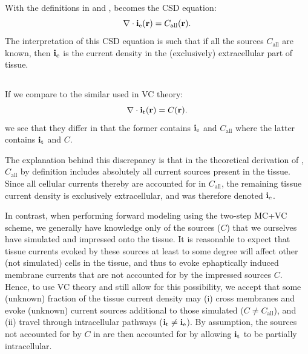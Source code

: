 With the definitions in  and , 
 becomes the CSD equation:
\begin{equation}
\nabla \cdot {\bf i_\mathrm{e}}({\bf r}) = C_\mathrm{all}({\bf r}).
\label{eq:VC:CSDie}
\end{equation}
The interpretation of this CSD equation is such that if all the sources $C_\mathrm{all}$ are known, 
then ${\bf i}_\text{e}$ is the current density in the (exclusively) extracellular part of tissue. 


\subsection{}
\label{sec:VC:C3}
If we compare  to the similar  used in VC theory:
\begin{equation}
\nabla \cdot {\bf i_\mathrm{t}}({\bf r}) =  C({\bf r}).
\label{eq:VC:CSDit}
\end{equation}
we see that they differ in that the former contains ${\bf i}_\text{e}$ and $C_\mathrm{all}$
where the latter contains ${\bf i}_\text{t}$ and $C$. 

The explanation behind this discrepancy 
is that in the theoretical derivation of , $C_\mathrm{all}$ by definition
includes absolutely all current sources present in the tissue. Since all cellular currents
thereby are accounted for in $C_\mathrm{all}$, the remaining tissue current density
is exclusively extracellular, and was therefore denoted ${\bf i}_\text{e}$.

In contrast, when performing forward modeling using the two-step MC+VC scheme, 
we generally have knowledge only of the sources ($C$) that we ourselves have simulated
and impressed onto the tissue. It is reasonable to expect that tissue currents evoked
by these sources at least to some degree will affect other (not simulated) cells in the tissue,
and thus to evoke ephaptically induced membrane currents that are not 
accounted for by the impressed sources $C$. 
Hence, to use VC theory and still allow for this possibility, 
we accept that some (unknown) fraction of the tissue current density may
(i) cross membranes and evoke (unknown) current sources additional to those simulated ($C \neq C_\text{all}$), 
and (ii) travel through intracellular pathways (${\bf i}_\text{t} \neq {\bf i}_\text{e}$).
By assumption, the sources not accounted for by $C$ in  
are then accounted for by allowing ${\bf i}_\text{t}$ to be partially intracellular. 

